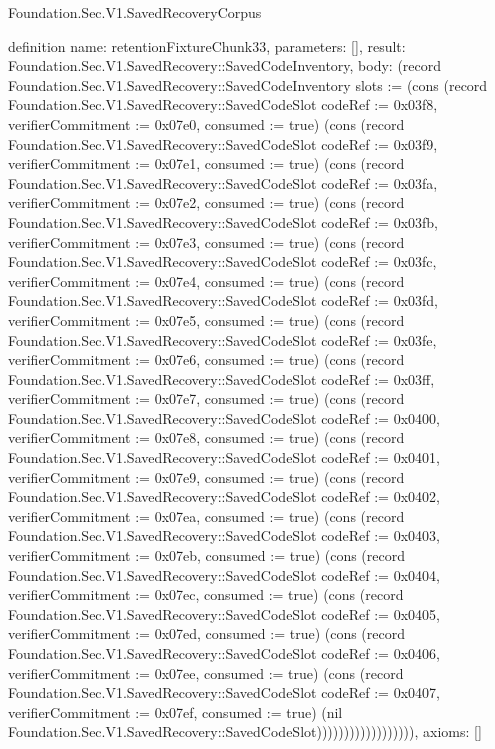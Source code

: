 \begin{lexlean}{Foundation.Sec.V1.SavedRecoveryCorpus}
\begin{semanticmodule}
definition{
  name: retentionFixtureChunk33,
  parameters: [],
  result: Foundation.Sec.V1.SavedRecovery::SavedCodeInventory,
  body: (record Foundation.Sec.V1.SavedRecovery::SavedCodeInventory {slots := (cons (record Foundation.Sec.V1.SavedRecovery::SavedCodeSlot {codeRef := 0x03f8, verifierCommitment := 0x07e0, consumed := true}) (cons (record Foundation.Sec.V1.SavedRecovery::SavedCodeSlot {codeRef := 0x03f9, verifierCommitment := 0x07e1, consumed := true}) (cons (record Foundation.Sec.V1.SavedRecovery::SavedCodeSlot {codeRef := 0x03fa, verifierCommitment := 0x07e2, consumed := true}) (cons (record Foundation.Sec.V1.SavedRecovery::SavedCodeSlot {codeRef := 0x03fb, verifierCommitment := 0x07e3, consumed := true}) (cons (record Foundation.Sec.V1.SavedRecovery::SavedCodeSlot {codeRef := 0x03fc, verifierCommitment := 0x07e4, consumed := true}) (cons (record Foundation.Sec.V1.SavedRecovery::SavedCodeSlot {codeRef := 0x03fd, verifierCommitment := 0x07e5, consumed := true}) (cons (record Foundation.Sec.V1.SavedRecovery::SavedCodeSlot {codeRef := 0x03fe, verifierCommitment := 0x07e6, consumed := true}) (cons (record Foundation.Sec.V1.SavedRecovery::SavedCodeSlot {codeRef := 0x03ff, verifierCommitment := 0x07e7, consumed := true}) (cons (record Foundation.Sec.V1.SavedRecovery::SavedCodeSlot {codeRef := 0x0400, verifierCommitment := 0x07e8, consumed := true}) (cons (record Foundation.Sec.V1.SavedRecovery::SavedCodeSlot {codeRef := 0x0401, verifierCommitment := 0x07e9, consumed := true}) (cons (record Foundation.Sec.V1.SavedRecovery::SavedCodeSlot {codeRef := 0x0402, verifierCommitment := 0x07ea, consumed := true}) (cons (record Foundation.Sec.V1.SavedRecovery::SavedCodeSlot {codeRef := 0x0403, verifierCommitment := 0x07eb, consumed := true}) (cons (record Foundation.Sec.V1.SavedRecovery::SavedCodeSlot {codeRef := 0x0404, verifierCommitment := 0x07ec, consumed := true}) (cons (record Foundation.Sec.V1.SavedRecovery::SavedCodeSlot {codeRef := 0x0405, verifierCommitment := 0x07ed, consumed := true}) (cons (record Foundation.Sec.V1.SavedRecovery::SavedCodeSlot {codeRef := 0x0406, verifierCommitment := 0x07ee, consumed := true}) (cons (record Foundation.Sec.V1.SavedRecovery::SavedCodeSlot {codeRef := 0x0407, verifierCommitment := 0x07ef, consumed := true}) (nil Foundation.Sec.V1.SavedRecovery::SavedCodeSlot)))))))))))))))))}),
  axioms: []
}


\end{semanticmodule}
\end{lexlean}
